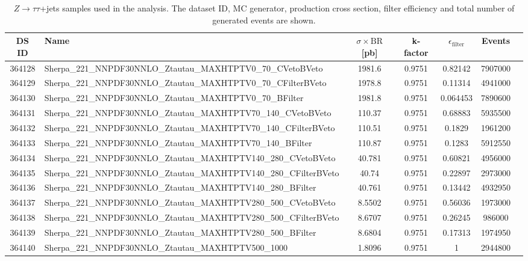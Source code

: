 \begin{landscape}
\begin{table}[!htb]
	\caption{$Z \to \tau\tau$+jets samples used in the analysis. The dataset ID, MC generator, production cross section, filter efficiency and total number of generated events are shown.}
	\label{tabular:mc_samples_Ztautaujets}
	\begin{footnotesize}
		\begin{center}
			\begin{tabular}{|c|l|c|c|c|c|r|}
				\hline
				DS ID & Name & $\sigma\times\text{BR}$ [pb] & k-factor & $\epsilon_{\text{filter}}$ & Events \\ \hline
				364128 & Sherpa\_221\_NNPDF30NNLO\_Ztautau\_MAXHTPTV0\_70\_CVetoBVeto & 1981.6 & 0.9751 & 0.82142 & 7907000 \\
				364129 & Sherpa\_221\_NNPDF30NNLO\_Ztautau\_MAXHTPTV0\_70\_CFilterBVeto & 1978.8 & 0.9751 & 0.11314 & 4941000 \\
				364130 & Sherpa\_221\_NNPDF30NNLO\_Ztautau\_MAXHTPTV0\_70\_BFilter & 1981.8 & 0.9751 & 0.064453 & 7890600 \\
				364131 & Sherpa\_221\_NNPDF30NNLO\_Ztautau\_MAXHTPTV70\_140\_CVetoBVeto & 110.37 & 0.9751 & 0.68883 & 5935500 \\
				364132 & Sherpa\_221\_NNPDF30NNLO\_Ztautau\_MAXHTPTV70\_140\_CFilterBVeto & 110.51 & 0.9751 & 0.1829 & 1961200 \\
				364133 & Sherpa\_221\_NNPDF30NNLO\_Ztautau\_MAXHTPTV70\_140\_BFilter & 110.87 & 0.9751 & 0.1283 & 5912550 \\
				364134 & Sherpa\_221\_NNPDF30NNLO\_Ztautau\_MAXHTPTV140\_280\_CVetoBVeto & 40.781 & 0.9751 & 0.60821 & 4956000 \\
				364135 & Sherpa\_221\_NNPDF30NNLO\_Ztautau\_MAXHTPTV140\_280\_CFilterBVeto & 40.74 & 0.9751 & 0.22897 & 2973000 \\
				364136 & Sherpa\_221\_NNPDF30NNLO\_Ztautau\_MAXHTPTV140\_280\_BFilter & 40.761 & 0.9751 & 0.13442 & 4932950 \\
				364137 & Sherpa\_221\_NNPDF30NNLO\_Ztautau\_MAXHTPTV280\_500\_CVetoBVeto & 8.5502 & 0.9751 & 0.56036 & 1973000 \\
				364138 & Sherpa\_221\_NNPDF30NNLO\_Ztautau\_MAXHTPTV280\_500\_CFilterBVeto & 8.6707 & 0.9751 & 0.26245 & 986000 \\
				364139 & Sherpa\_221\_NNPDF30NNLO\_Ztautau\_MAXHTPTV280\_500\_BFilter & 8.6804 & 0.9751 & 0.17313 & 1974950 \\
				364140 & Sherpa\_221\_NNPDF30NNLO\_Ztautau\_MAXHTPTV500\_1000 & 1.8096 & 0.9751 & 1 & 2944800 \\

\end{tabular}
\end{center}
\end{footnotesize}
\end{table}
\end{landscape}
